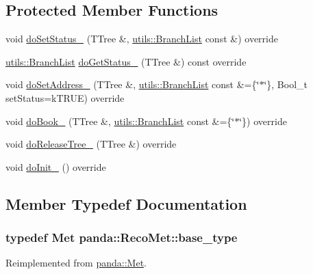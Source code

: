 \subsection*{Protected Member Functions}
\begin{DoxyCompactItemize}
\item 
void \hyperlink{classpanda_1_1RecoMet_ada709eee42912be17dc1575083bc5f99}{doSetStatus\_\-} (TTree \&, \hyperlink{classpanda_1_1utils_1_1BranchList}{utils::BranchList} const \&) override
\item 
\hyperlink{classpanda_1_1utils_1_1BranchList}{utils::BranchList} \hyperlink{classpanda_1_1RecoMet_a17e58c29268fd0e3f84467046cf28f2b}{doGetStatus\_\-} (TTree \&) const override
\item 
void \hyperlink{classpanda_1_1RecoMet_a6b54b0213c71dc2208c24bae6f709e2c}{doSetAddress\_\-} (TTree \&, \hyperlink{classpanda_1_1utils_1_1BranchList}{utils::BranchList} const \&=\{\char`\"{}$\ast$\char`\"{}\}, Bool\_\-t setStatus=kTRUE) override
\item 
void \hyperlink{classpanda_1_1RecoMet_aa276d8e80b96770de06ea62231930a35}{doBook\_\-} (TTree \&, \hyperlink{classpanda_1_1utils_1_1BranchList}{utils::BranchList} const \&=\{\char`\"{}$\ast$\char`\"{}\}) override
\item 
void \hyperlink{classpanda_1_1RecoMet_a264ac3eeeaf567babde8c3847317bcc9}{doReleaseTree\_\-} (TTree \&) override
\item 
void \hyperlink{classpanda_1_1RecoMet_aa94e2fce017ff71bd6fcfa4f02356248}{doInit\_\-} () override
\end{DoxyCompactItemize}


\subsection{Member Typedef Documentation}
\hypertarget{classpanda_1_1RecoMet_a08f27abd8ffe21cbfa4b44ce77a19bf3}{
\subsubsection[{base\_\-type}]{\setlength{\rightskip}{0pt plus 5cm}typedef {\bf Met} {\bf panda::RecoMet::base\_\-type}}}
\label{classpanda_1_1RecoMet_a08f27abd8ffe21cbfa4b44ce77a19bf3}


Reimplemented from \hyperlink{classpanda_1_1Met_a1676ccce630ca27435393bad8059cfcc}{panda::Met}.

